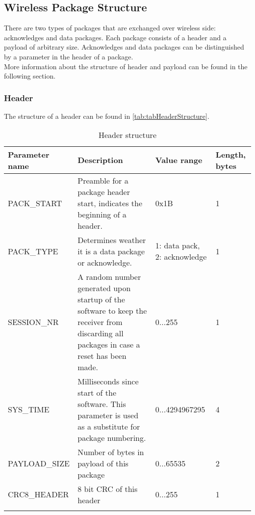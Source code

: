 \subsection{Wireless Package Structure}
There are two types of packages that are exchanged over wireless side: acknowledges and data packages. Each package consists of a header and a payload of arbitrary size. Acknowledges and data packages can be distinguished by a parameter in the header of a package. \\
More information about the structure of header and payload can be found in the following section.
\subsubsection{Header}
The structure of a header can be found in \autoref{tab:tabHeaderStructure}. \\
%
\begin{center}
    \begin{longtable}{p{3cm}p{8cm}p{2cm}p{1cm}}
        \hline
        \textbf{Parameter name} & \textbf{Description} & \textbf{Value range} & \textbf{Length, bytes} \\
        \hline
        PACK\_START & Preamble for a package header start, indicates the beginning of a header. & 0x1B & 1\\
        \hline
        PACK\_TYPE &  Determines weather it is a data package or acknowledge. & 1: data pack, 2: acknowledge & 1\\
        \hline
        SESSION\_NR &  A random number generated upon startup of the software to keep the receiver from discarding all packages in case a reset has been made. & 0...255 & 1\\
        \hline
        SYS\_TIME &  Milliseconds since start of the software. This parameter is used as a substitute for package numbering. & 0...4294967295 & 4\\
        \hline
        PAYLOAD\_SIZE &  Number of bytes in payload of this package & 0...65535 & 2\\
        \hline
        CRC8\_HEADER &  8 bit CRC of this header & 0...255 & 1\\
        \hline
        \caption{Header structure}
        \label{tab:tabHeaderStructure}    
    \end{longtable}
\end{center}
